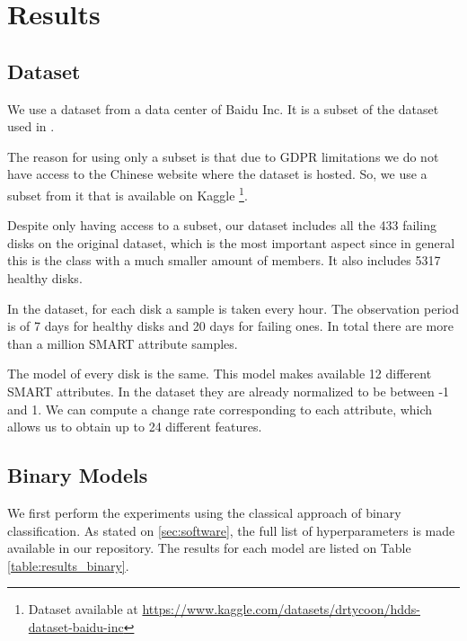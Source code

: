 \chapter{Results}\label{chap:results}

\section{Dataset}

We use a dataset from a data center of Baidu Inc.
It is a subset of the dataset used in \cite{Zhu13}.

The reason for using only a subset is that due to GDPR limitations we do not have access to the Chinese website where the dataset is hosted.
So, we use a subset from it that is available on Kaggle \footnote{Dataset available at \url{https://www.kaggle.com/datasets/drtycoon/hdds-dataset-baidu-inc}}.

Despite only having access to a subset, our dataset includes all the 433 failing disks on the original dataset, which is the most important aspect since in general this is the class with a much smaller amount of members.
It also includes 5317 healthy disks.

In the dataset, for each disk a sample is taken every hour.
The observation period is of 7 days for healthy disks and 20 days for failing ones.
In total there are more than a million SMART attribute samples.

The model of every disk is the same.
This model makes available 12 different SMART attributes.
In the dataset they are already normalized to be between -1 and 1.
We can compute a change rate corresponding to each attribute, which allows us to obtain up to 24 different features.

\section{Binary Models}

We first perform the experiments using the classical approach of binary classification.
As stated on \ref{sec:software}, the full list of hyperparameters is made available in our repository.
The results for each model are listed on Table \ref{table:results_binary}.

